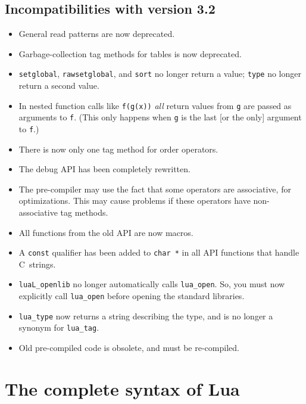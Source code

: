 \documentclass[11pt]{article}
\newcommand{\Index}[1]{#1\index{#1}}
\begin{document}
\subsection*{Incompatibilities with \Index{version 3.2}}
\begin{itemize}

\item
General read patterns are now deprecated.
\item
Garbage-collection tag methods for tables is now deprecated.
\item
\verb|setglobal|, \verb|rawsetglobal|, and \verb|sort| no longer return a value;
\verb|type| no longer return a second value.
\item
In nested function calls like \verb|f(g(x))|
\emph{all} return values from \verb|g| are passed as arguments to \verb|f|.
(This only happens when \verb|g| is the last
[or the only] argument to \verb|f|.)
\item
There is now only one tag method for order operators.
\item
The debug API has been completely rewritten.
\item
The pre-compiler may use the fact that some operators are associative,
for optimizations.
This may cause problems if these operators
have non-associative tag methods.
\item
All functions from the old API are now macros.
\item
A \verb|const| qualifier has been added to \verb|char *|
in all API functions that handle C~strings.
\item
\verb|luaL_openlib| no longer automatically calls \verb|lua_open|.
So,
you must now explicitly call \verb|lua_open| before opening
the standard libraries.
\item
\verb|lua_type| now returns a string describing the type,
and is no longer a synonym for \verb|lua_tag|.
\item Old pre-compiled code is obsolete, and must be re-compiled.

\end{itemize}

\section*{The complete syntax of Lua}

\renewenvironment{Produc}{\vspace{0.8ex}\par\noindent\hspace{3ex}\it\begin{tabular}{rrl}}{\end{tabular}\vspace{0.8ex}\par\noindent}
\end{document}
